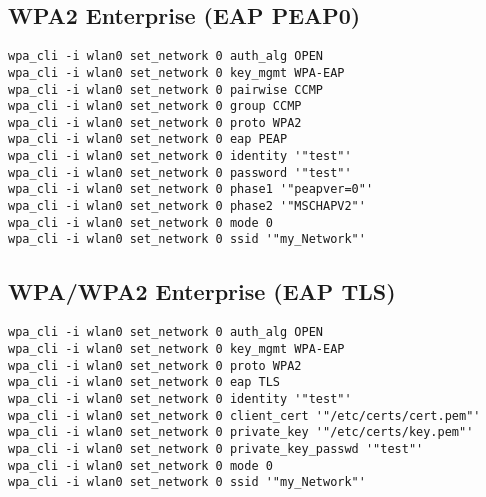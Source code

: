 \subsection{WPA2 Enterprise (EAP PEAP0)}
\begin{lstlisting}[style=text]
wpa_cli -i wlan0 set_network 0 auth_alg OPEN
wpa_cli -i wlan0 set_network 0 key_mgmt WPA-EAP
wpa_cli -i wlan0 set_network 0 pairwise CCMP
wpa_cli -i wlan0 set_network 0 group CCMP
wpa_cli -i wlan0 set_network 0 proto WPA2
wpa_cli -i wlan0 set_network 0 eap PEAP
wpa_cli -i wlan0 set_network 0 identity '"test"'
wpa_cli -i wlan0 set_network 0 password '"test"'
wpa_cli -i wlan0 set_network 0 phase1 '"peapver=0"'
wpa_cli -i wlan0 set_network 0 phase2 '"MSCHAPV2"'
wpa_cli -i wlan0 set_network 0 mode 0
wpa_cli -i wlan0 set_network 0 ssid '"my_Network"'
\end{lstlisting}

\subsection{WPA/WPA2 Enterprise (EAP TLS)}
\begin{lstlisting}[style=text]
wpa_cli -i wlan0 set_network 0 auth_alg OPEN
wpa_cli -i wlan0 set_network 0 key_mgmt WPA-EAP
wpa_cli -i wlan0 set_network 0 proto WPA2
wpa_cli -i wlan0 set_network 0 eap TLS
wpa_cli -i wlan0 set_network 0 identity '"test"'
wpa_cli -i wlan0 set_network 0 client_cert '"/etc/certs/cert.pem"'
wpa_cli -i wlan0 set_network 0 private_key '"/etc/certs/key.pem"'
wpa_cli -i wlan0 set_network 0 private_key_passwd '"test"'
wpa_cli -i wlan0 set_network 0 mode 0
wpa_cli -i wlan0 set_network 0 ssid '"my_Network"'
\end{lstlisting}



